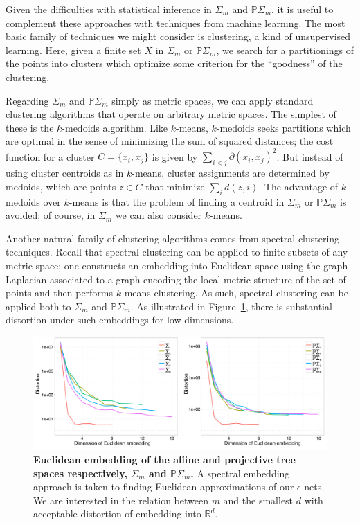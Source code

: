 \documentclass[a4paper,11pt]{article}
\begin{document}
Given the difficulties with statistical inference in $\Sigma_m$ and $\mathbb{P}\Sigma_m$, it is useful to complement these approaches with techniques from machine learning.
The most basic family of techniques we might consider is clustering, a kind of unsupervised learning.
Here, given a finite set $X$ in $\Sigma_m$ or $\mathbb{P}\Sigma_m$, we search for a partitionings of the points into clusters which optimize some criterion for the ``goodness'' of the clustering.

Regarding $\Sigma_m$ and $\mathbb{P}\Sigma_m$ simply as metric spaces, we can apply standard clustering algorithms that operate on arbitrary metric spaces.
The simplest of these is the $k$-medoids algorithm.
Like $k$-means, $k$-medoids seeks partitions which are optimal in the sense of minimizing the sum of squared distances; the cost function for a cluster $C = \{x_i, x_j\}$ is given by $\sum_{i < j} \partial(x_i,x_j)^2$.
But instead of using cluster centroids as in $k$-means, cluster assignments are determined by medoids, which are points $z \in C$ that minimize $\sum_i d(z,i)$.
The advantage of $k$-medoids over $k$-means is that the problem of finding a centroid in $\Sigma_m$ or $\mathbb{P}\Sigma_m$ is avoided; of course, in $\Sigma_m$ we can also consider $k$-means.

Another natural family of clustering algorithms comes from spectral clustering techniques.
Recall that spectral clustering can be applied to finite subsets of any metric space; one constructs an embedding into Euclidean space using the graph Laplacian associated to a graph encoding the local metric structure of the set of points and then performs $k$-means clustering.
As such, spectral clustering can be applied both to $\Sigma_m$ and $\mathbb{P}\Sigma_m$.
As illustrated in Figure~\ref{fig:embedding}, there is substantial distortion under such embeddings for low dimensions.

\begin{figure}
    \centering
    \includegraphics[width=\linewidth]{../figures/stats_embedding.pdf}
    \caption{{\bf Euclidean embedding of the affine and projective tree spaces respectively, $\Sigma_m$ and $\mathbb{P}\Sigma_m$.} A spectral embedding approach is taken to finding Euclidean approximations of our $\epsilon$-nets. We are interested in the relation between $m$ and the smallest $d$ with acceptable distortion of embedding into $\mathbb{R}^d$.}
    \label{fig:embedding}
\end{figure}
\end{document}
